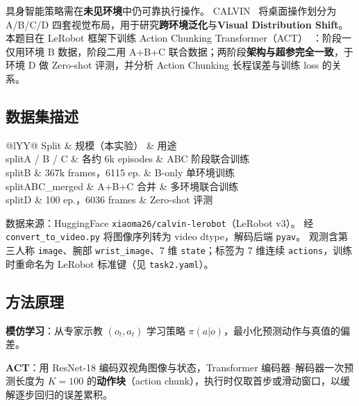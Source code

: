 \documentclass[10pt,twocolumn,letterpaper]{article}
\newcommand{\cvprtable}[1]{%
  \scriptsize
  \setlength{\tabcolsep}{2.5pt}%
  \renewcommand{\arraystretch}{1.08}%
  #1%
}
\begin{document}
具身智能策略需在\textbf{未见环境}中仍可靠执行操作。
CALVIN~\cite{mees2022calvin} 将桌面操作划分为 A/B/C/D 四套视觉布局，用于研究\textbf{跨环境泛化}与\textbf{Visual Distribution Shift}。
本题目在 LeRobot 框架下训练 Action Chunking Transformer（ACT）~\cite{zhao2023act}：阶段一仅用环境 B 数据，阶段二用 A+B+C 联合数据；两阶段\textbf{架构与超参完全一致}，于环境 D 做 Zero-shot 评测，并分析 Action Chunking 长程误差与训练 loss 的关系。

\subsection{数据集描述}
\label{sec:task2_data}

\begin{table}[t]
  \centering
  \caption{CALVIN-LeRobot 数据集划分与用途。}
  \label{tab:task2_dataset}
  \cvprtable{%
  \begin{tabularx}{\linewidth}{@{}lYY@{}}
    \toprule
    Split & 规模（本实验） & 用途 \\
    \midrule
    splitA / B / C & 各约 6k episodes & ABC 阶段联合训练 \\
    splitB & 367k frames，6115 ep. & B-only 单环境训练 \\
    splitABC\_merged & A+B+C 合并 & 多环境联合训练 \\
    splitD & 100 ep.，6036 frames & Zero-shot 评测 \\
    \bottomrule
  \end{tabularx}%
  }
\end{table}

数据来源：HuggingFace \texttt{xiaoma26/calvin-lerobot}（LeRobot v3）。
经 \texttt{convert\_to\_video.py} 将图像序列转为 video dtype，解码后端 \texttt{pyav}。
观测含第三人称 \texttt{image}、腕部 \texttt{wrist\_image}、7 维 \texttt{state}；标签为 7 维连续 \texttt{actions}，训练时重命名为 LeRobot 标准键（见 \texttt{task2.yaml}）。

\subsection{方法原理}
\label{sec:task2_method}

\textbf{模仿学习}：从专家示教 $(o_t, a_t)$ 学习策略 $\pi(a|o)$，最小化预测动作与真值的偏差。

\textbf{ACT}：用 ResNet-18 编码双视角图像与状态，Transformer 编码器--解码器一次预测长度为 $K{=}100$ 的\textbf{动作块}（action chunk），执行时仅取首步或滑动窗口，以缓解逐步回归的误差累积。
\end{document}
